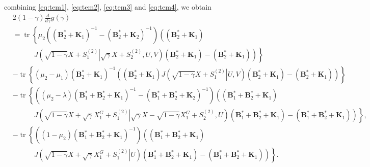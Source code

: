 \documentclass[journal,final, onecolumn]{IEEEtran}
\DeclareMathOperator{\tr}{tr}
\begin{document}
combining \eqref{eq:tem1}, \eqref{eq:tem2}, \eqref{eq:tem3} and \eqref{eq:tem4}, we obtain
\begin{align}
& 2(1-\gamma)\frac{d}{d\gamma}g(\gamma) \nonumber \\
&=\tr \left\{    \mu_2 \left(     (\boldsymbol{B}_2^{*} + \boldsymbol{K}_{1})^{-1} - \left(  \boldsymbol{B}_2^{*} + \boldsymbol{K}_{2}     \right)^{-1}       \right) \left(  \left(  \boldsymbol{B}_2^{*} + \boldsymbol{K}_{1}     \right) \right.\right. \nonumber \\
& \quad\qquad\left.\left.   J   \left(  \sqrt{1-\gamma}X+S^{(2)}_{1} \left|   \sqrt{\gamma}X+S^{(2)}_{2}, U,V \right. \right)  \left(  \boldsymbol{B}_2^{*} + \boldsymbol{K}_{1}     \right)  -\left(  \boldsymbol{B}_2^{*} + \boldsymbol{K}_{1}     \right)\right)     \right\}  \\
&  - \tr \left\{       (\mu_2-\mu_1)   (\boldsymbol{B}_2^{*} + \boldsymbol{K}_{1})^{-1}  \left(  \left(  \boldsymbol{B}_2^{*} + \boldsymbol{K}_{1}     \right) J   \left(\left.  \sqrt{1-\gamma}X+S^{(2)}_{1} \right|   U,V  \right)\left(  \boldsymbol{B}_2^{*} + \boldsymbol{K}_{1}     \right)  -\left(  \boldsymbol{B}_2^{*} + \boldsymbol{K}_{1}     \right)\right)     \right\} \\
&-\tr \left\{     \left(  (\mu_2-\lambda)   (\boldsymbol{B}_1^{*}+\boldsymbol{B}_2^{*} + \boldsymbol{K}_{1})^{-1} - \left( \boldsymbol{B}_1^{*}+ \boldsymbol{B}_2^{*} + \boldsymbol{K}_{2}     \right)^{-1}       \right) \left(  \left( \boldsymbol{B}_1^{*}+ \boldsymbol{B}_2^{*} + \boldsymbol{K}_{1}     \right) \right.\right. \nonumber \\
& \quad\qquad\left.\left.    J   \left(  \sqrt{1-\gamma}X+\sqrt{\gamma}X^{G}_{1}+S^{(2)}_{1} \left|   \sqrt{\gamma}X-\sqrt{1-\gamma}X_{1}^{G}+S^{(2)}_{2}, U \right. \right) \left(  \boldsymbol{B}_1^{*}+\boldsymbol{B}_2^{*} + \boldsymbol{K}_{1}     \right)  -\left( \boldsymbol{B}_1^{*}+ \boldsymbol{B}_2^{*} + \boldsymbol{K}_{1}     \right)\right)     \right\},\\
&-\tr \left\{     \left(   (1-\mu_2)  (\boldsymbol{B}_1^{*}+\boldsymbol{B}_2^{*} + \boldsymbol{K}_{1})^{-1}  \right) \left(  \left( \boldsymbol{B}_1^{*}+ \boldsymbol{B}_2^{*} + \boldsymbol{K}_{1}     \right) \right.\right. \nonumber \\
& \quad\qquad\left.\left.    J   \left( \left. \sqrt{1-\gamma}X+\sqrt{\gamma}X^{G}_{1}+S^{(2)}_{1} \right|  U  \right) \left( \boldsymbol{B}_1^{*}+ \boldsymbol{B}_2^{*} + \boldsymbol{K}_{1}     \right)  -\left(  \boldsymbol{B}_1^{*}+\boldsymbol{B}_2^{*} + \boldsymbol{K}_{1}     \right)\right)     \right\}.
\end{align}
\end{document}

